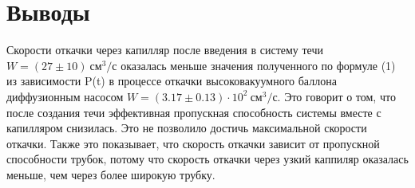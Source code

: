 \chapter{Выводы}
\label{ch:conclusions}

Скорости откачки через капилляр после введения в систему течи $W = (27 \pm 10) \ \text{см}^3 / \text{с}$ оказалась меньше значения полученного по формуле (1) из зависимости P(t) в процессе откачки высоковакуумного баллона диффузионным насосом $W = (3.17 \pm 0.13) \cdot 10^2~\text{см}^3/\text{с}$. Это говорит о том, что после создания течи эффективная пропускная способность системы вместе с капилляром снизилась. Это не позволило достичь максимальной скорости откачки. Также это показывает, что скорость откачки зависит от пропускной способности трубок, потому что скорость откачки через узкий каппиляр оказалась меньше, чем через более широкую трубку.